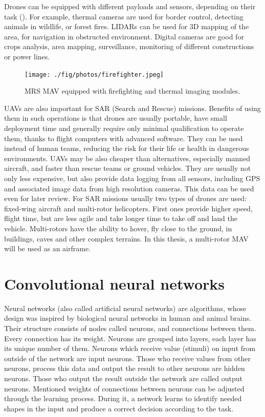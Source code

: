 Drones can be equipped with different payloads and sensors, depending on their task (). For example, thermal cameras are used for border control, detecting animals in wildlife, or forest fires. LIDARs can be used for 3D mapping of the area, for navigation in obstructed environment. Digital cameras are good for crops analysis, area mapping, surveillance, monitoring of different constructions or power lines. 


\begin{figure}[!h]
  \centering
  \texttt{[image: ./fig/photos/firefighter.jpeg]}

  \caption{MRS MAV equipped with firefighting and thermal imaging modules.}
  \label{fig:firefighter}
\end{figure}


UAVs are also important for SAR (Search and Rescue) missions. Benefits of using them in such operations is that drones are usually portable, have small deployment time and generally require only minimal qualification to operate them, thanks to flight computers with advanced software. They can be used instead of human teams, reducing the risk for their life or health in dangerous environments. UAVs may be also cheaper than alternatives, especially manned aircraft, and faster than rescue teams or ground vehicles. They are usually not only less expensive, but also provide data logging from all sensors, including GPS and associated image data from high resolution cameras. This data can be used even for later review. For SAR missions usually two types of drones are used: fixed-wing aircraft and multi-rotor helicopters. First ones provide higher speed, flight time, but are less agile and take longer time to take off and land the vehicle. Multi-rotors have the ability to hover, fly close to the ground, in buildings, caves and other complex terrains. In this thesis, a multi-rotor MAV will be used as an airframe. 


\section{Convolutional neural networks}

Neural networks (also called artificial neural networks) are algorithms, whose design was inspired by biological neural networks in human and animal brains. Their structure consists of nodes called neurons, and connections between them. Every connection has its weight. Neurons are grouped into layers, each layer has its unique number of them. Neurons which receive value (stimuli) on input from outside of the network are input neurons. Those who receive values from other neurons, process this data and output the result to other neurons are hidden neurons. Those who output the result outside the network are called output neurons. Mentioned weights of connections between neurons can be adjusted through the learning process. During it, a network learns to identify needed shapes in the input and produce a correct decision according to the task. 

